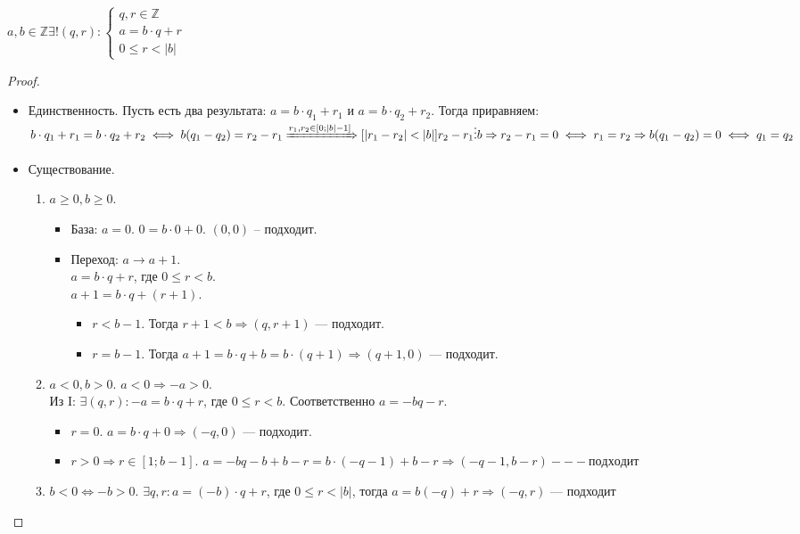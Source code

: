 \begin{theorem}
    $a, b \in \mathbb{Z} \exists ! (q,r): \left\{ \begin{array}{l} q, r \in \mathbb{Z} \\ a = b \cdot q + r \\ 0 \le r < |b| \end{array} \right.$
\end{theorem}
\begin{proof}
    \begin{itemize}
        \item 
        Единственность. Пусть есть два результата: $a = b \cdot q_1 + r_1$ и $a = b \cdot q_2 + r_2$. Тогда приравняем: $b \cdot q_1 + r_1 = b \cdot q_2 + r_2 \iff b(q_1 - q_2) = r_2 - r_1 \xRightarrow{r_1, r_2 \in \left[0;|b|-1\right]}[|r_1-r_2| < |b|] r_2-r_1 \vdots b \Rightarrow r_2-r_1=0 \iff r_1=r_2 \Rightarrow b(q_1-q_2)=0 \iff q_1=q_2$ 
    \item Существование. 
        \begin{enumerate}[label=\Roman*.,ref=\arabic*]
            \item $a \ge 0, b \ge 0$. 
            \begin{itemize}
            \item    
                База: $a = 0$. $0 = b \cdot 0 + 0$.  $(0, 0)$ -- подходит.
            \item
                Переход:  $a \to a + 1$.\\
                $a = b \cdot q + r$, где  $0 \le r < b$.\\
                $a + 1 = b \cdot q + (r + 1)$.
                \begin{itemize}
                    \item $r < b - 1$. Тогда  $r + 1 < b \Rightarrow \left(q, r+1\right)$ --- подходит.
                    \item  $r = b - 1$. Тогда $a + 1 = b \cdot q + b = b \cdot (q + 1) \Rightarrow (q + 1, 0)$ --- подходит.
                \end{itemize}
            \end{itemize}
        \item  $a  < 0, b > 0$. $a < 0 \Rightarrow -a > 0$. \\
            Из I:  $\exists (q, r): -a = b \cdot q + r$, где $0 \le r < b$. Соответственно $a = -bq - r$.
            \begin{itemize}
                \item $r = 0$.  $a = b \cdot q + 0 \Rightarrow (-q, 0)$ --- подходит.
                \item  $r > 0 \Rightarrow r \in \left[1; b - 1\right]$.  $a = -bq -b + b -r = b \cdot (-q -1) + b - r \Rightarrow \left( -q -1, b-r\right) --- подходит$
            \end{itemize}
        \item $b < 0 \iff -b > 0$.  $\exists q, r: a = (-b) \cdot q + r$, где  $0 \le r < |b|$, тогда $a = b(-q) +r \Rightarrow (-q, r)\text{ --- подходит}$
        \end{enumerate}
    \end{itemize}
\end{proof}

